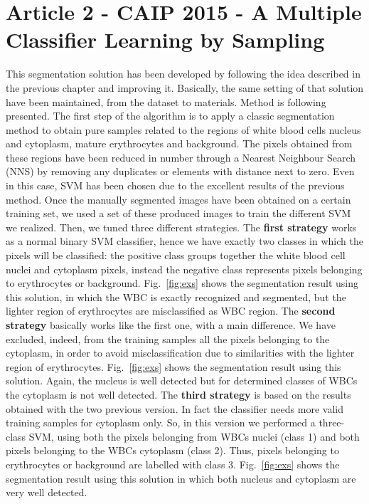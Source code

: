 \documentclass[final,a4paper,12pt,english]{UnicaPhdThesis3}
\begin{document}
	\section{Article 2 - CAIP 2015 -  A Multiple Classifier Learning by Sampling}
	This segmentation solution has been developed by following the idea described in the previous chapter and improving it.
	Basically, the same setting of that solution have been maintained, from the dataset to materials. Method is following presented.
	The first step of the algorithm is to apply a classic segmentation method to obtain pure samples related to the regions of white blood cells nucleus and cytoplasm, mature erythrocytes and background. The pixels obtained from these regions have been reduced in number through a Nearest Neighbour  Search (NNS) by removing any duplicates or elements with distance next to zero. Even in this case, SVM has been chosen due to the excellent results of the previous method. Once the manually segmented images have been obtained on a certain training set, we used a set of these produced images to train the different SVM we realized. Then, we tuned three different strategies. 
	The \textbf{first strategy} works as a normal binary SVM classifier, hence we have exactly two classes in which the pixels will be classified: the positive class groups together the white blood cell nuclei and cytoplasm pixels, instead the negative class represents pixels belonging to erythrocytes or background. Fig.~\ref{fig:exs} shows the segmentation result using this solution, in which the WBC is exactly recognized and segmented, but the lighter region of erythrocytes are misclassified as WBC region. 
	The \textbf{second strategy} basically works like the first one, with a main difference. We have excluded, indeed, from the training samples all the pixels belonging to the cytoplasm, in order to avoid misclassification due to similarities with the lighter region of erythrocytes. Fig.~\ref{fig:exs} shows the segmentation result using this solution. Again, the nucleus is well detected but for determined classes of WBCs the cytoplasm is not well detected. 
	The \textbf{third strategy} is based on the results obtained with the two previous version. In fact the classifier needs more valid training samples for cytoplasm only. So, in this version we performed a three-class SVM, using both the pixels belonging from WBCs nuclei (class 1) and both pixels belonging to the WBCs cytoplasm (class 2). Thus, pixels belonging to erythrocytes or background are labelled with class 3. Fig.~\ref{fig:exs} shows the segmentation result using this solution in which both nucleus and cytoplasm are very well detected.
\end{document}
